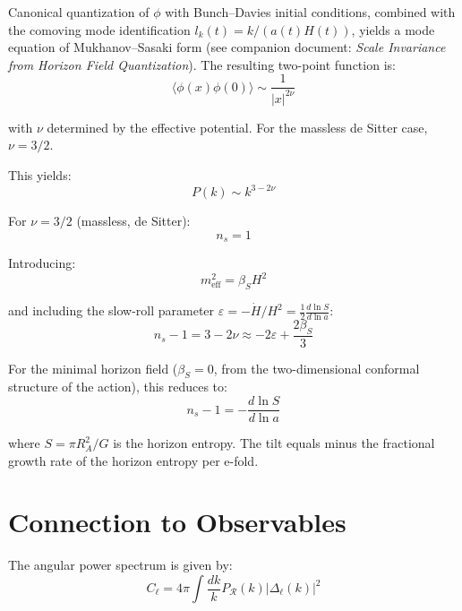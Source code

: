 \documentclass[12pt,a4paper]{article}
\begin{document}
Canonical quantization of $\phi$ with Bunch--Davies initial conditions, combined with the comoving mode identification $l_k(t) = k/(a(t)H(t))$, yields a mode equation of Mukhanov--Sasaki form (see companion document: \textit{Scale Invariance from Horizon Field Quantization}). The resulting two-point function is:
\begin{equation}
\langle\phi(x)\phi(0)\rangle \sim \frac{1}{|x|^{2\nu}} \tag{29}
\end{equation}

with $\nu$ determined by the effective potential. For the massless de Sitter case, $\nu = 3/2$.

This yields:
\begin{equation}
P(k) \sim k^{3 - 2\nu} \tag{30}
\end{equation}

For $\nu = 3/2$ (massless, de Sitter):
\begin{equation}
n_s = 1 \tag{31}
\end{equation}

Introducing:
\begin{equation}
m_\text{eff}^2 = \beta_S H^2 \tag{32}
\end{equation}

and including the slow-roll parameter $\varepsilon = -\dot{H}/H^2 = \frac{1}{2}\frac{d\ln S}{d\ln a}$:
\begin{equation}
n_s - 1 = 3 - 2\nu \approx -2\varepsilon + \frac{2\beta_S}{3} \tag{33}
\end{equation}

For the minimal horizon field ($\beta_S = 0$, from the two-dimensional conformal structure of the action), this reduces to:
\begin{equation}
n_s - 1 = -\frac{d\ln S}{d\ln a} \tag{33a}
\end{equation}

where $S = \pi R_A^2/G$ is the horizon entropy. The tilt equals minus the fractional growth rate of the horizon entropy per e-fold.

\section{Connection to Observables}

The angular power spectrum is given by:
\begin{equation}
C_\ell = 4\pi \int \frac{dk}{k} P_\mathcal{R}(k) |\Delta_\ell(k)|^2 \tag{34}
\end{equation}
\end{document}
